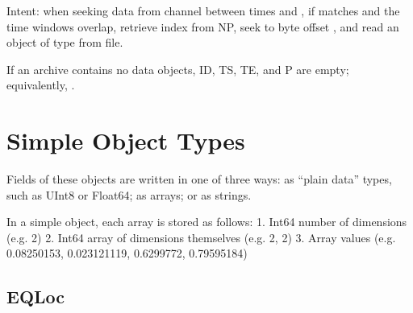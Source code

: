 \documentclass[letterpaper,11pt,english]{sphinxmanual}
\begin{document}
Intent: when seeking data from channel  between times  and ,
if  matches  and the time windows overlap, retrieve index
 from NP, seek to byte offset , and read an object of
type  from file.

If an archive contains no data objects, ID, TS, TE, and P are empty;
equivalently, .


\section{Simple Object Types}
\label{\detokenize{src/Appendices/seisio_file_format:simple-object-types}}
Fields of these objects are written in one of three ways: as “plain data” types,
such as UInt8 or Float64; as arrays; or as strings.

In a simple object, each array is stored as follows:
1. Int64 number of dimensions (e.g. 2)
2. Int64 array of dimensions themselves (e.g. 2, 2)
3. Array values (e.g. 0.08250153, 0.023121119, 0.6299772, 0.79595184)


\subsection{EQLoc}
\label{\detokenize{src/Appendices/seisio_file_format:eqloc}}
\end{document}

